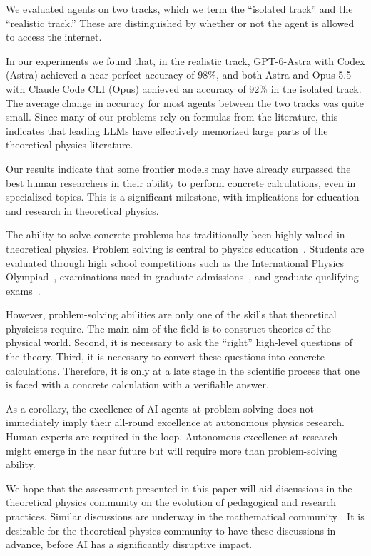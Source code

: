 \documentclass[aps,prd,reprint,superscriptaddress,nofootinbib]{revtex4-2}
\begin{document}
We evaluated agents on two tracks, which we term the ``isolated track'' and the ``realistic track.'' These are distinguished by whether or not the agent is allowed to access the internet. 

In our experiments we found that, in the realistic track, GPT-6-Astra with Codex (Astra) achieved a near-perfect accuracy of 98\%, and both Astra and Opus 5.5 with Claude Code CLI (Opus) achieved an accuracy of 92\% in the isolated track. The average change in accuracy for most agents between the two tracks was quite small. Since many of our problems rely on formulas from the literature, this indicates that leading LLMs have effectively memorized large parts of the theoretical physics literature. 
 

Our results indicate that some frontier models may have already surpassed the best human researchers in their ability to perform concrete calculations, even in specialized topics. This is a significant milestone, with implications for education and research in theoretical physics.

The ability to solve concrete problems has traditionally been highly valued in theoretical physics. Problem solving is central to physics education~\cite{Hsu2004ProblemSolving,Docktor2014Synthesis}. Students are evaluated through high school competitions such as the International Physics Olympiad~\cite{Hayano:2024IPhO}, examinations used in graduate admissions~\cite{Miller:2019Admissions}, and graduate qualifying exams~\cite{newbury1991princeton}. 

However, problem-solving abilities are only one of the skills that theoretical physicists require. The main aim of the field is to construct theories of the physical world. Second, it is necessary to ask the ``right'' high-level questions of the theory. Third, it is necessary to convert these questions into concrete calculations. Therefore, it is only at a late stage in the scientific process that one is faced with a concrete calculation with a verifiable answer. 

As a corollary, the excellence of AI agents at problem solving does not immediately imply their all-round excellence at autonomous physics research. Human experts are required in the loop. Autonomous excellence at research might emerge in the near future but will require more than problem-solving ability. 


We hope that the assessment presented in this paper will aid discussions in the theoretical physics community on the evolution of pedagogical and research practices. Similar discussions are underway in the mathematical community \cite{alper2026leiden,avila2026misalignment}. It is desirable for the theoretical physics community to have these discussions in advance, before AI has a significantly disruptive impact.
\end{document}
